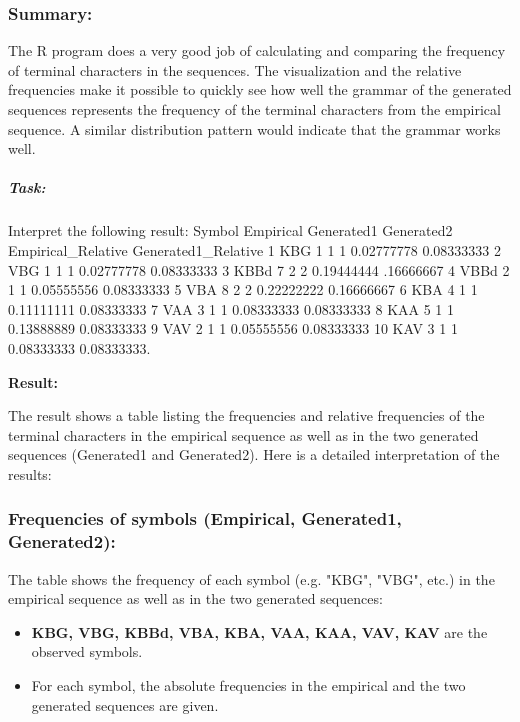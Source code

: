 \documentclass[
]{article}
\begin{document}
\subsubsection{\texorpdfstring{\textbf{Summary:}}{Summary:}}\label{summary-1}

The R program does a very good job of calculating and comparing the
frequency of terminal characters in the sequences. The visualization and
the relative frequencies make it possible to quickly see how well the
grammar of the generated sequences represents the frequency of the
terminal characters from the empirical sequence. A similar distribution
pattern would indicate that the grammar works well.

\subparagraph{\texorpdfstring{ \textbf{Task:}}{ Task:}}\label{task-8}

Interpret the following result:\textquotesingle{} Symbol Empirical
Generated1 Generated2 Empirical\_Relative Generated1\_Relative 1 KBG 1 1
1 0.02777778 0.08333333 2 VBG 1 1 1 0.02777778 0.08333333 3 KBBd 7 2 2
0.19444444 .16666667 4 VBBd 2 1 1 0.05555556 0.08333333 5 VBA 8 2 2
0.22222222 0.16666667 6 KBA 4 1 1 0.11111111 0.08333333 7 VAA 3 1 1
0.08333333 0.08333333 8 KAA 5 1 1 0.13888889 0.08333333 9 VAV 2 1 1
0.05555556 0.08333333 10 KAV 3 1 1 0.08333333
0.08333333\textquotesingle.

\textbf{Result:}

The result shows a table listing the frequencies and relative
frequencies of the terminal characters in the empirical sequence as well
as in the two generated sequences (Generated1 and Generated2). Here is a
detailed interpretation of the results:

\subsubsection{\texorpdfstring{\textbf{Frequencies of symbols
(Empirical, Generated1,
Generated2):}}{Frequencies of symbols (Empirical, Generated1, Generated2):}}\label{frequencies-of-symbols-empirical-generated1-generated2}

The table shows the frequency of each symbol (e.g. "KBG", "VBG", etc.)
in the empirical sequence as well as in the two generated sequences:

\begin{itemize}
\item
  \textbf{KBG, VBG, KBBd, VBA, KBA, VAA, KAA, VAV, KAV} are the observed
  symbols.
\item
  For each symbol, the absolute frequencies in the empirical and the two
  generated sequences are given.
\end{itemize}
\end{document}

